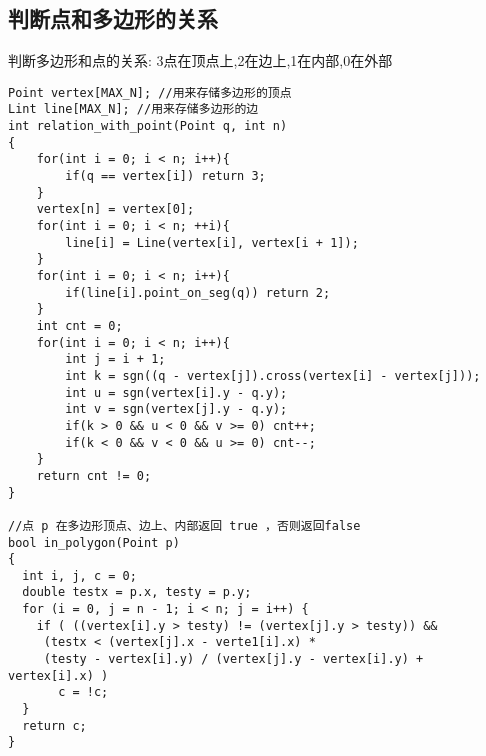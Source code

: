 \subsection{判断点和多边形的关系}
判断多边形和点的关系: 3点在顶点上,2在边上,1在内部,0在外部
\begin{lstlisting}
Point vertex[MAX_N]; //用来存储多边形的顶点
Lint line[MAX_N]; //用来存储多边形的边
int relation_with_point(Point q, int n)
{
    for(int i = 0; i < n; i++){
        if(q == vertex[i]) return 3;
    }
    vertex[n] = vertex[0];
    for(int i = 0; i < n; ++i){
        line[i] = Line(vertex[i], vertex[i + 1]);
    }
    for(int i = 0; i < n; i++){
        if(line[i].point_on_seg(q)) return 2;
    }
    int cnt = 0;
    for(int i = 0; i < n; i++){
        int j = i + 1;
        int k = sgn((q - vertex[j]).cross(vertex[i] - vertex[j]));
        int u = sgn(vertex[i].y - q.y);
        int v = sgn(vertex[j].y - q.y);
        if(k > 0 && u < 0 && v >= 0) cnt++;
        if(k < 0 && v < 0 && u >= 0) cnt--;
    }
    return cnt != 0;
}

//点 p 在多边形顶点、边上、内部返回 true ，否则返回false
bool in_polygon(Point p)
{
  int i, j, c = 0;
  double testx = p.x, testy = p.y;
  for (i = 0, j = n - 1; i < n; j = i++) {
    if ( ((vertex[i].y > testy) != (vertex[j].y > testy)) &&
     (testx < (vertex[j].x - verte1[i].x) *
     (testy - vertex[i].y) / (vertex[j].y - vertex[i].y) + vertex[i].x) )
       c = !c;
  }
  return c;
}
\end{lstlisting}

